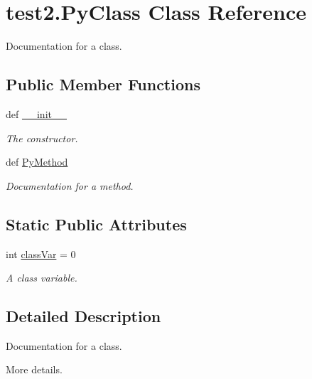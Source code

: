 \hypertarget{classtest2_1_1PyClass}{\section{test2.\-Py\-Class \-Class \-Reference}
\label{classtest2_1_1PyClass}
}


\-Documentation for a class.  


\subsection*{\-Public \-Member \-Functions}
\begin{DoxyCompactItemize}
\item 
def \hyperlink{classtest2_1_1PyClass_a6afe0a6ac8109e6a37fa2f7d68b09b5e}{\-\_\-\-\_\-init\-\_\-\-\_\-}
\begin{DoxyCompactList}\small\item\em \-The constructor. \end{DoxyCompactList}\item 
def \hyperlink{classtest2_1_1PyClass_a38c4f616876b8653ce448f4e6450fa54}{\-Py\-Method}
\begin{DoxyCompactList}\small\item\em \-Documentation for a method. \end{DoxyCompactList}\end{DoxyCompactItemize}
\subsection*{\-Static \-Public \-Attributes}
\begin{DoxyCompactItemize}
\item 
int \hyperlink{classtest2_1_1PyClass_a830ce177c3b94007c61615fd1f33717d}{class\-Var} = 0
\begin{DoxyCompactList}\small\item\em \-A class variable. \end{DoxyCompactList}\end{DoxyCompactItemize}


\subsection{\-Detailed \-Description}
\-Documentation for a class. 

\-More details. 

